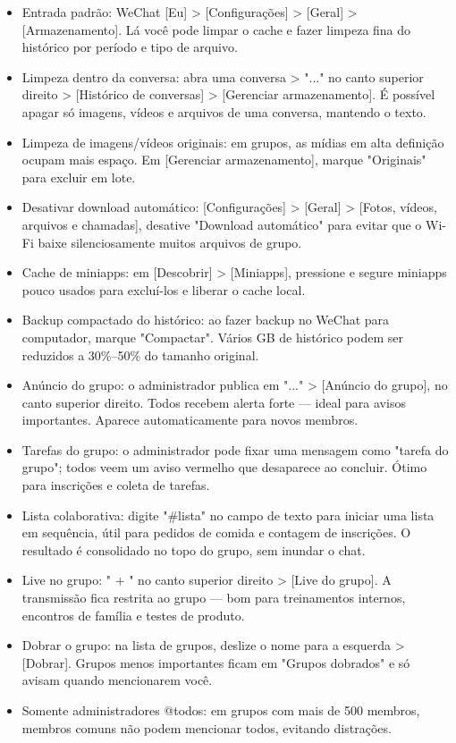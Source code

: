 
\begin{itemize}
  \item Entrada padrão: WeChat [Eu] > [Configurações] > [Geral] > [Armazenamento]. Lá você pode limpar o cache e fazer limpeza fina do histórico por período e tipo de arquivo.
  \item Limpeza dentro da conversa: abra uma conversa > "..." no canto superior direito > [Histórico de conversas] > [Gerenciar armazenamento]. É possível apagar só imagens, vídeos e arquivos de uma conversa, mantendo o texto.
  \item Limpeza de imagens/vídeos originais: em grupos, as mídias em alta definição ocupam mais espaço. Em [Gerenciar armazenamento], marque "Originais" para excluir em lote.
  \item Desativar download automático: [Configurações] > [Geral] > [Fotos, vídeos, arquivos e chamadas], desative "Download automático" para evitar que o Wi-Fi baixe silenciosamente muitos arquivos de grupo.
  \item Cache de miniapps: em [Descobrir] > [Miniapps], pressione e segure miniapps pouco usados para excluí-los e liberar o cache local.
  \item Backup compactado do histórico: ao fazer backup no WeChat para computador, marque "Compactar". Vários GB de histórico podem ser reduzidos a 30\%–50\% do tamanho original.
\end{itemize}


\begin{itemize}
  \item Anúncio do grupo: o administrador publica em "..." > [Anúncio do grupo], no canto superior direito. Todos recebem alerta forte — ideal para avisos importantes. Aparece automaticamente para novos membros.
  \item Tarefas do grupo: o administrador pode fixar uma mensagem como "tarefa do grupo"; todos veem um aviso vermelho que desaparece ao concluir. Ótimo para inscrições e coleta de tarefas.
  \item Lista colaborativa: digite "\#lista" no campo de texto para iniciar uma lista em sequência, útil para pedidos de comida e contagem de inscrições. O resultado é consolidado no topo do grupo, sem inundar o chat.
  \item Live no grupo: " + " no canto superior direito > [Live do grupo]. A transmissão fica restrita ao grupo — bom para treinamentos internos, encontros de família e testes de produto.
  \item Dobrar o grupo: na lista de grupos, deslize o nome para a esquerda > [Dobrar]. Grupos menos importantes ficam em "Grupos dobrados" e só avisam quando mencionarem você.
  \item Somente administradores @todos: em grupos com mais de 500 membros, membros comuns não podem mencionar todos, evitando distrações.
\end{itemize}

